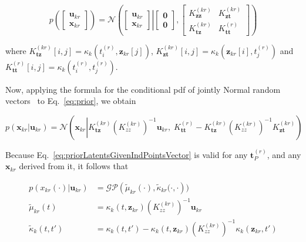 \documentclass[12pt]{article}
\begin{document}
\begin{equation}
    p\left(\left[\begin{array}{c}
        \mathbf{u}_{kr}\\
        \mathbf{x}_{kr}
    \end{array}\right]\right)
    =\mathcal{N}\left(\left.\left[\begin{array}{c}
        \mathbf{u}_{kr}\\
        \mathbf{x}_{kr}
    \end{array}\right]\right|\left[\begin{array}{c}
        \mathbf{0}\\
        \mathbf{0}
    \end{array}\right],\left[\begin{array}{cc}
        K_\mathbf{zz}^{(kr)}&K_\mathbf{zt}^{(kr)}\\
        K_\mathbf{tz}^{(kr)}&K_\mathbf{tt}^{(r)}
    \end{array}\right]\right)
    \label{eq:prior}
\end{equation}

\noindent where
$K_\mathbf{tz}^{(kr)}[i,j]=\kappa_k(t^{(r)}_i,\mathbf{z}_{kr}[j])$,
$K_\mathbf{zt}^{(kr)}[i,j]=\kappa_k(\mathbf{z}_{kr}[i],t_j^{(r)})$
and
$K_\mathbf{tt}^{(r)}[i,j]=\kappa_k(t_i^{(r)},t_j^{(r)})$.

Now, applying the formula for the conditional pdf of jointly Normal random
vectors~\citep[][Eq. 2.116]{bishop06} to Eq.~\ref{eq:prior}, we obtain

\begin{equation}
    p(\mathbf{x}_{kr}|\mathbf{u}_{kr})=\mathcal{N}\left(\mathbf{x}_{kr}\left|K_\mathbf{tz}^{(kr)}\left(K_{zz}^{(kr)}\right)^{-1}\mathbf{u}_{kr},\;K_\mathbf{tt}^{(r)}-K_\mathbf{tz}^{(kr)}\left(K_{zz}^{(kr)}\right)^{-1}K_\mathbf{zt}^{(kr)}\right.\right)
    \label{eq:priorLatentsGivenIndPointsVector}
\end{equation}

Because Eq.~\ref{eq:priorLatentsGivenIndPointsVector} is valid for any
$\mathbf{t}_P^{(r)}$, and any $\mathbf{x}_{kr}$ derived from it, it follows that

\begin{equation}
    \begin{aligned}
        p(x_{kr}(\cdot)|\mathbf{u}_{kr})&=\mathcal{GP}\left(\tilde{\mu}_{kr}(\cdot),\tilde{\kappa}_{kr}(\cdot,\cdot\right))\\
        \tilde{\mu}_{kr}(t)&=\kappa_k(t,\mathbf{z}_{kr})\left(K_{zz}^{(kr)}\right)^{-1}\mathbf{u}_{kr}\\
        \tilde{\kappa}_k(t,t')&=\kappa_k(t,t')-\kappa_k(t,\mathbf{z}_{kr})\left(K_{zz}^{(kr)}\right)^{-1}\kappa_k(\mathbf{z}_{kr},t')
        \label{eq:priorLatentsGivenIndPoints} 
    \end{aligned}
\end{equation}
\end{document}
